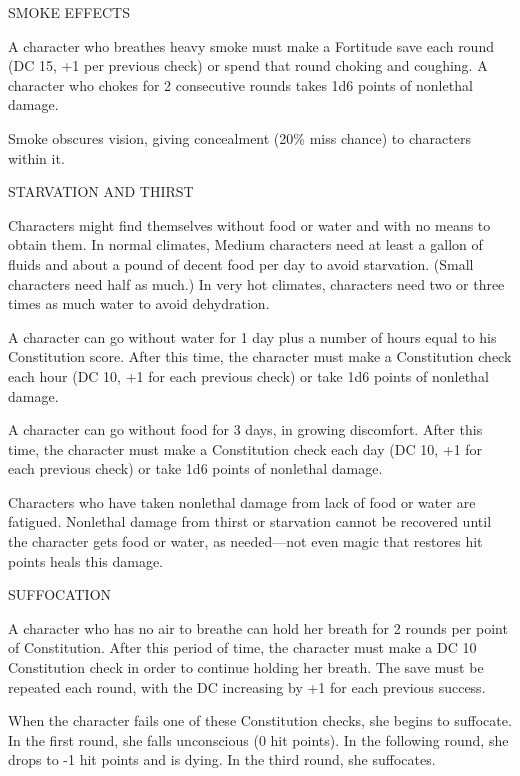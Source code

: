 \documentclass{article}
\begin{document}
\vspace{12pt}
SMOKE EFFECTS

A character who breathes heavy smoke must make a Fortitude save each round (DC 
15, +1 per previous check) or spend that round choking and coughing. A character 
who chokes for 2 consecutive rounds takes 1d6 points of nonlethal damage.

Smoke obscures vision, giving concealment (20\% miss chance) to characters within 
it.

\vspace{12pt}
STARVATION AND THIRST

Characters might find themselves without food or water and with no means to obtain 
them. In normal climates, Medium characters need at least a gallon of fluids and 
about a pound of decent food per day to avoid starvation. (Small characters need 
half as much.) In very hot climates, characters need two or three times as much 
water to avoid dehydration.

A character can go without water for 1 day plus a number of hours equal to his 
Constitution score. After this time, the character must make a Constitution check 
each hour (DC 10, +1 for each previous check) or take 1d6 points of nonlethal damage.

A character can go without food for 3 days, in growing discomfort. After this time, 
the character must make a Constitution check each day (DC 10, +1 for each previous 
check) or take 1d6 points of nonlethal damage.

Characters who have taken nonlethal damage from lack of food or water are fatigued. 
Nonlethal damage from thirst or starvation cannot be recovered until the character 
gets food or water, as needed---not even magic that restores hit points heals this 
damage.

\vspace{12pt}
SUFFOCATION

A character who has no air to breathe can hold her breath for 2 rounds per point 
of Constitution. After this period of time, the character must make a DC 10 Constitution 
check in order to continue holding her breath. The save must be repeated each round, 
with the DC increasing by +1 for each previous success.

When the character fails one of these Constitution checks, she begins to suffocate. 
In the first round, she falls unconscious (0 hit points). In the following round, 
she drops to -1 hit points and is dying. In the third round, she suffocates.
\end{document}
